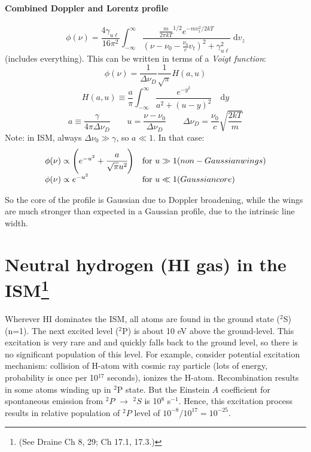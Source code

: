 \documentclass[11pt]{article}
\newcommand{\mar}[1]{\hspace{0pt}\marginpar{-\textcolor{black}{#1}-}}
\begin{document}
\paragraph{Combined Doppler and Lorentz profile}
\[
    \phi(\nu)
    = \frac{4\gamma_{u\ell}}{16\pi^{2}} \int_{-\infty}^{\infty}{
        \frac{\frac{m}{2{\pi}kT}^{1/2} e^{-mv_{t}^{2} / 2kT } }
        { \left( \nu - \nu_{0} - \frac{\nu_{0}}{c} v_{t} \right) ^{2}
        + \gamma_{u\ell}^{2} } \;\mathrm{d}v_{z}}
    \]
(includes everything).
This can be written in terms of a \textit{Voigt function}:
\[
    \phi(\nu)
    = \frac{1}{\Delta\nu_{D}} \frac{1}{\sqrt{\pi}} H(a,u)
    \]
\[
    H(a,u) \equiv \frac{a}{\pi} \int_{-\infty}^{\infty}{
        \frac{e^{-y^{2}}}{a^{2}+(u-y)^{2}}\quad\mathrm{d}y }
    \]
\[
    a \equiv \frac{\gamma}{4\pi\Delta\nu_{D}} \qquad
    u = \frac{\nu-\nu_{0}}{\Delta\nu_{D}} \qquad
    \Delta\nu_{D} = \frac{\nu_{0}}{c} \sqrt{\frac{2kT}{m}}
    \]
Note: in ISM, always $\Delta\nu_{0} \gg \gamma$, so $a \ll 1$.
In that case:
\[
    \begin{array}{l l}
    \phi(\nu) \propto \left( e^{-u^{2}} + \cfrac{a}{\sqrt{\pi} u^{2}}
        \right) & \mathrm{for}\ u \gg 1 (non-Gaussian wings)\\
        \phi(\nu) \propto e^{-u^{2}} & \mathrm{for}\ u \ll 1 (Gaussian core)
    \end{array}
    \]

\mar{33}So the core of the profile is Gaussian due to Doppler broadening,
while the wings are much stronger than expected in a Gaussian profile,
due to the intrinsic line width.

\newpage
\section{Neutral hydrogen (HI gas) in the ISM\footnote{
    (See Draine Ch 8, 29; Ch 17.1, 17.3.)}}

Wherever HI dominates the ISM, all atoms are found in the ground state
($^{2}$S)(n=1). The next excited level ($^{2}$P) is about 10 eV above the
ground-level. This excitation is very rare and and quickly falls back to the
ground level, so there is no significant population of this level. For example,
consider potential excitation mechanism: collision of H-atom with cosmic ray
particle (lots of energy, probability is once per 10$^{17}$ seconds), ionizes
the H-atom. Recombination results in some atoms winding up in $^{2}$P state.
But the Einstein $A$ coefficient for spontaneous emission from $^{2}P$
$\rightarrow$ $^{2}S$ is 10$^{8}$ s$^{-1}$. Hence, this excitation process
results in relative population of $^{2}P$ level of $10^{-8}/10^{17} =
10^{-25}$.
\end{document}
